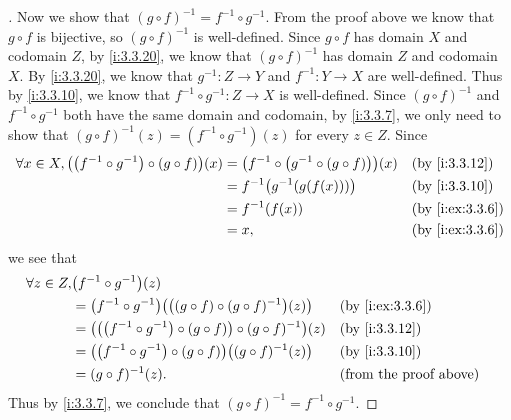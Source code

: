 \begin{proof}[]
  Now we show that \((g \circ f)^{-1} = f^{-1} \circ g^{-1}\).
  From the proof above we know that \(g \circ f\) is bijective, so \((g \circ f)^{-1}\) is well-defined.
  Since \(g \circ f\) has domain \(X\) and codomain \(Z\), by \cref{i:3.3.20}, we know that \((g \circ f)^{-1}\) has domain \(Z\) and codomain \(X\).
  By \cref{i:3.3.20}, we know that \(g^{-1} : Z \to Y\) and \(f^{-1} : Y \to X\) are well-defined.
  Thus by \cref{i:3.3.10}, we know that \(f^{-1} \circ g^{-1} : Z \to X\) is well-defined.
  Since \((g \circ f)^{-1}\) and \(f^{-1} \circ g^{-1}\) both have the same domain and codomain, by \cref{i:3.3.7}, we only need to show that \((g \circ f)^{-1}(z) = (f^{-1} \circ g^{-1})(z)\) for every \(z \in Z\).
  Since
  \begin{align*}
    \forall x \in X, \pa{\pa{f^{-1} \circ g^{-1}} \circ (g \circ f)}(x) & = \pa{f^{-1} \circ \pa{g^{-1} \circ \pa{g \circ f}}}(x) &  & \by{i:3.3.12}   \\
                                                                        & = f^{-1}\pa{g^{-1}\pa{g(f(x))}}                         &  & \by{i:3.3.10}   \\
                                                                        & = f^{-1}(f(x))                                          &  & \by{i:ex:3.3.6} \\
                                                                        & = x,                                                    &  & \by{i:ex:3.3.6}
  \end{align*}
  we see that
  \begin{align*}
    \forall z \in Z, & \pa{f^{-1} \circ g^{-1}}(z)                                                                                         \\
                     & = \pa{f^{-1} \circ g^{-1}}\pa{\pa{(g \circ f) \circ (g \circ f)^{-1}}(z)}        &  & \by{i:ex:3.3.6}               \\
                     & = \pa{\pa{\pa{f^{-1} \circ g^{-1}} \circ (g \circ f)} \circ (g \circ f)^{-1}}(z) &  & \by{i:3.3.12}                 \\
                     & = \pa{\pa{f^{-1} \circ g^{-1}} \circ (g \circ f)}\pa{(g \circ f)^{-1}(z)}        &  & \by{i:3.3.10}                 \\
                     & = (g \circ f)^{-1}(z).                                                           &  & \text{(from the proof above)}
  \end{align*}
  Thus by \cref{i:3.3.7}, we conclude that \((g \circ f)^{-1} = f^{-1} \circ g^{-1}\).
\end{proof}

